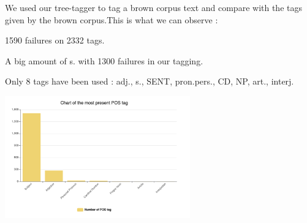 We used our tree-tagger to tag a brown corpus text and compare with the tags given by the brown corpus.This is what we can observe :

\begin{description}

\item 1590 failures on 2332 tags.
\item A big amount of s. with 1300 failures in our tagging.
\item Only 8 tags have been used :
			adj., s., SENT, pron.pers., CD, NP, art., interj.

\end{description}

\begin{center}
	\includegraphics[width=8cm]{graphres.png}
\end{center}
